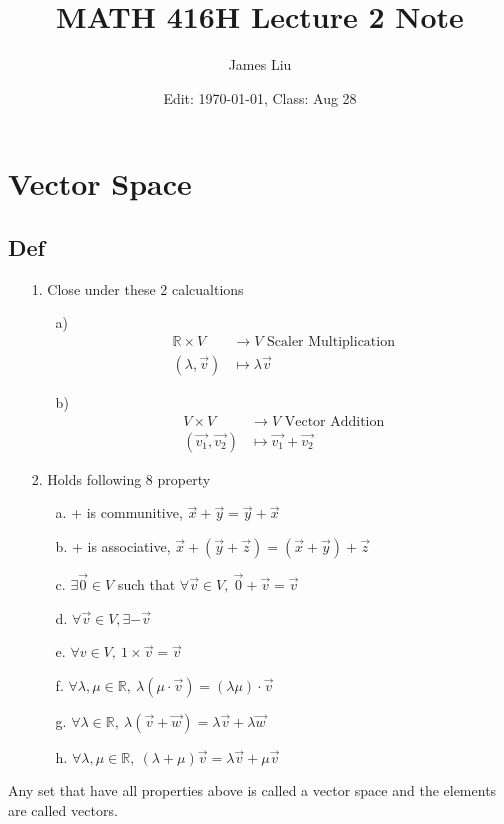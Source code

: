 \documentclass{article}
\date{Edit: \today, Class: Aug 28}
\title{MATH 416H Lecture 2 Note}
\author{James Liu}
\begin{document}
\maketitle
\section*{Vector Space}
\subsection*{Def}
\begin{itemize}
    \item [1.] Close under these 2 calcualtions
    \begin{itemize}
        \item [a)]
        \begin{align}
            \mathbb{R}\times V&\longrightarrow V \text{  Scaler Multiplication}\\
            (\lambda,\overrightarrow{v})&\longmapsto \lambda \overrightarrow{v}
        \end{align}
        \item [b)]
        \begin{align}
            V\times V &\longrightarrow V \text{ Vector Addition}\\
            (\overrightarrow{v_1},\overrightarrow{v_2})&\longmapsto \overrightarrow{v_1}+\overrightarrow{v_2}
        \end{align}
    \end{itemize}
    \item [2.] Holds following 8 property
    \begin{itemize}
        \item [a.] + is communitive, \(\overrightarrow{x}+\overrightarrow{y}=\overrightarrow{y}+\overrightarrow{x}\)
        \item [b.] + is associative, \(\overrightarrow{x}+(\overrightarrow{y}+\overrightarrow{z})=(\overrightarrow{x}+\overrightarrow{y})+\overrightarrow{z}\)
        \item [c.] \(\exists \overrightarrow{0}\in V\) such that \(\forall \overrightarrow{v}\in V,\ \overrightarrow{0}+\overrightarrow{v}=\overrightarrow{v}\)
        \item [d.] \(\forall \overrightarrow{v}\in V, \exists -\overrightarrow{v}\)
        \item [e.] \(\forall v\in V, \ 1\times \overrightarrow{v}=\overrightarrow{v}\)
        \item [f.] \(\forall \lambda,\mu\in\mathbb{R},\ \lambda(\mu\cdot\overrightarrow{v})=(\lambda\mu)\cdot \overrightarrow{v}\)
        \item [g.] \(\forall \lambda\in\mathbb{R},\ \lambda(\overrightarrow{v}+\overrightarrow{w})=\lambda \overrightarrow{v}+\lambda\overrightarrow{w}\)
        \item [h.] \(\forall \lambda,\mu\in\mathbb{R},\ (\lambda+\mu)\overrightarrow{v}=\lambda\overrightarrow{v}+\mu\overrightarrow{v}\)
    \end{itemize}
\end{itemize}
Any set that have all properties above is called a vector space and the elements are called vectors.
\end{document}
